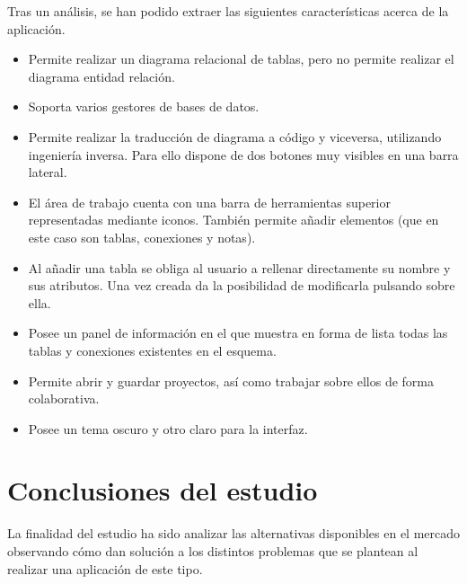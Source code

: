 Tras un análisis, se han podido extraer las siguientes características acerca de la aplicación.
\begin{itemize}
    \item Permite realizar un diagrama relacional de tablas, pero no permite realizar el diagrama entidad relación.
    \item Soporta varios gestores de bases de datos.
    \item Permite realizar la traducción de diagrama a código y viceversa, utilizando ingeniería inversa. Para ello dispone de dos botones muy visibles en una barra lateral.
    \item El área de trabajo cuenta con una barra de herramientas superior representadas mediante iconos. También permite añadir elementos (que en este caso son tablas, conexiones y notas).
    \item Al añadir una tabla se obliga al usuario a rellenar directamente su nombre y sus atributos. Una vez creada da la posibilidad de modificarla pulsando sobre ella.
    \item Posee un panel de información en el que muestra en forma de lista todas las tablas y conexiones existentes en el esquema.
    \item Permite abrir y guardar proyectos, así como trabajar sobre ellos de forma colaborativa.
    \item Posee un tema oscuro y otro claro para la interfaz.
\end{itemize}
\section{Conclusiones del estudio}
La finalidad del estudio ha sido analizar las alternativas disponibles en el mercado observando cómo dan solución a los distintos problemas que se plantean al realizar una aplicación de este tipo.

